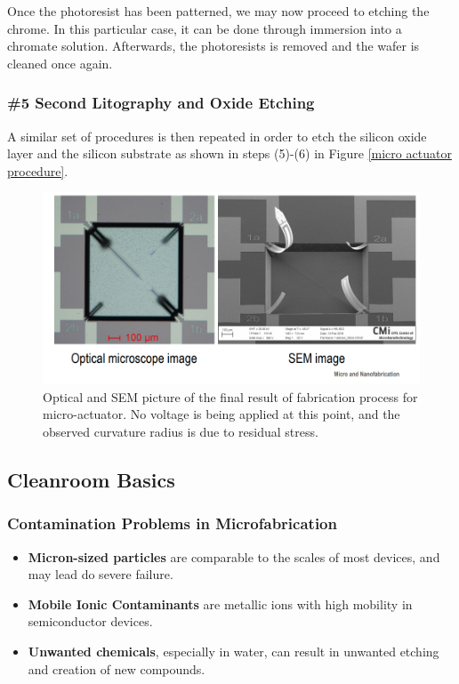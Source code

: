 \documentclass[12pt,a4paper]{report}
\begin{document}
Once the photoresist has been patterned, we may now proceed to etching the chrome. In this particular case, it can be done through immersion into a chromate solution. Afterwards, the photoresists is removed and the wafer is cleaned once again.

\subsubsection{\#5 Second Litography and Oxide Etching}

A similar set of procedures is then repeated in order to etch the silicon oxide layer and the silicon substrate as shown in steps (5)-(6) in Figure \ref{micro actuator procedure}.

\begin{figure}[H]
    \centering
    \includegraphics[width=0.8\linewidth]{final micro-actuator.png}
    \caption{Optical and SEM picture of the final result of fabrication process for micro-actuator. No voltage is being applied at this point, and the observed curvature radius is due to residual stress.}
    \label{final.micro.actuator}
\end{figure}

\subsection{Cleanroom Basics}

\subsubsection{Contamination Problems in Microfabrication}

\begin{itemize}
    \item \textbf{Micron-sized particles} are comparable to the scales of most devices, and may lead do severe failure.
    \item \textbf{Mobile Ionic Contaminants} are metallic ions with high mobility in semiconductor devices.
    \item \textbf{Unwanted chemicals}, especially in water, can result in unwanted etching and creation of new compounds.
\end{itemize}
\end{document}
